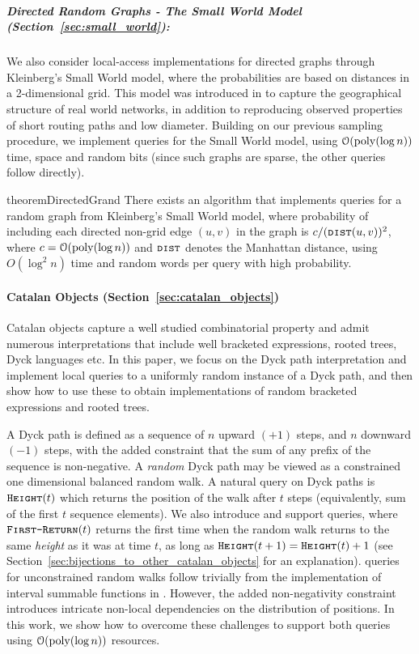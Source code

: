 \subparagraph*{Directed Random Graphs - The Small World Model (Section~\ref{sec:small_world}):}
\label{par:directed_random_graphs}
We also consider local-access implementations for directed graphs through Kleinberg's Small World model,
where the probabilities are based on distances in a 2-dimensional grid.
This model was introduced in \cite{kleinberg} to capture the geographical structure of real world networks,
in addition to reproducing observed properties of short routing paths and low diameter.
Building on our previous sampling procedure, we implement  queries for the Small World model,
using $\mathcal{O}(\mathrm{poly}(\log n))$ time, space and random bits (since such graphs are sparse, the other queries follow directly).
\begin{restatable}{theorem}{DirectedGrand}\label{DirectedGrand}
There exists an algorithm that implements  queries for a random graph from Kleinberg's Small World model,
where probability of including each directed non-grid edge $(u,v)$ in the graph is $c/(\texttt{\textsc{dist}}(u,v))^2$,
where $c = \mathcal O(\mathrm{poly}(\log n))$ and $\texttt{\textsc{dist}}$ denotes the Manhattan distance,
using $O(\log^2 n)$ time and random words per query with high probability.
\end{restatable}




\paragraph*{Catalan Objects (Section~\ref{sec:catalan_objects})}%
\label{par:intro_catalan_objects}
Catalan objects capture a well studied combinatorial property and admit numerous interpretations that include
well bracketed expressions, rooted trees, Dyck languages etc.
In this paper, we focus on the Dyck path interpretation and implement local queries to a uniformly random instance of a Dyck path,
and then show how to use these to obtain implementations of random bracketed expressions and rooted trees.

A Dyck path is defined as a sequence of $n$ upward $(+1)$ steps, and $n$ downward $(-1)$ steps,
with the added constraint that the sum of any prefix of the sequence is non-negative.
A \emph{random} Dyck path may be viewed as a constrained one dimensional balanced random walk.
A natural query on Dyck paths is $\texttt{\textsc{Height}}(t)$ which returns the position of the walk after $t$ steps
(equivalently, sum of the first $t$ sequence elements).
We also introduce and support  queries, where $\texttt{\textsc{First-Return}}(t)$ returns
the first time when the random walk returns to the same \emph{height} as it was at time $t$, as long as $\texttt{\textsc{Height}}(t+1)=\texttt{\textsc{Height}}(t)+1$
(see Section~\ref{sec:bijections_to_other_catalan_objects} for an explanation).
 queries for unconstrained random walks follow trivially from the implementation of interval summable functions in \cite{huge}.
However, the added non-negativity constraint introduces intricate non-local dependencies on the distribution of positions.
In this work, we show how to overcome these challenges to support both queries using $\mathcal O(\mathrm{poly}(\log n))$ resources.

